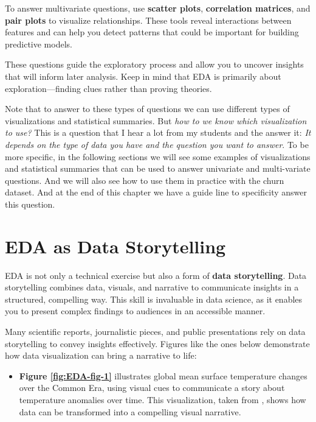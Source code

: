 \documentclass[
]{book}
\providecommand{\tightlist}{%
  \setlength{\itemsep}{0pt}\setlength{\parskip}{0pt}}
\theoremstyle{definition}
\theoremstyle{definition}
\theoremstyle{definition}
\theoremstyle{definition}
\theoremstyle{remark}
\begin{document}
To answer multivariate questions, use \textbf{scatter plots}, \textbf{correlation matrices}, and \textbf{pair plots} to visualize relationships. These tools reveal interactions between features and can help you detect patterns that could be important for building predictive models.

These questions guide the exploratory process and allow you to uncover insights that will inform later analysis. Keep in mind that EDA is primarily about exploration---finding clues rather than proving theories.

Note that to answer to these types of questions we can use different types of visualizations and statistical summaries. But \emph{how to we know which visualization to use?} This is a question that I hear a lot from my students and the answer it: \emph{It depends on the type of data you have and the question you want to answer}. To be more specific, in the following sections we will see some examples of visualizations and statistical summaries that can be used to answer univariate and multi-variate questions. And we will also see how to use them in practice with the churn dataset. And at the end of this chapter we have a guide line to specificity answer this question.

\section{EDA as Data Storytelling}\label{eda-as-data-storytelling}

EDA is not only a technical exercise but also a form of \textbf{data storytelling}. Data storytelling combines data, visuals, and narrative to communicate insights in a structured, compelling way. This skill is invaluable in data science, as it enables you to present complex findings to audiences in an accessible manner.

Many scientific reports, journalistic pieces, and public presentations rely on data storytelling to convey insights effectively. Figures like the ones below demonstrate how data visualization can bring a narrative to life:

\begin{itemize}
\tightlist
\item
  \textbf{Figure \ref{fig:EDA-fig-1}} illustrates global mean surface temperature changes over the Common Era, using visual cues to communicate a story about temperature anomalies over time. This visualization, taken from \citet{neukom2019consistent}, shows how data can be transformed into a compelling visual narrative.
\end{itemize}
\end{document}

